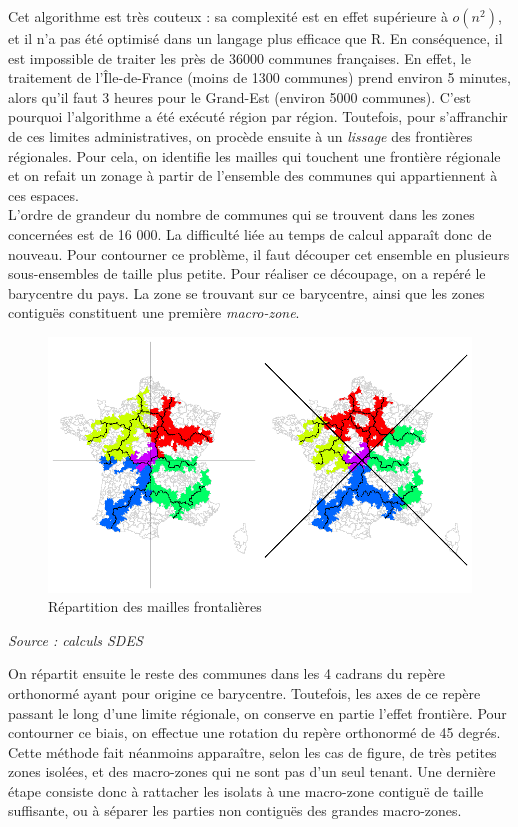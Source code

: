 \documentclass[12pt, a4paper]{article}
\begin{document}
Cet algorithme est très couteux : sa complexité est en effet supérieure à $o(n^2)$, et il n'a pas été optimisé dans un langage plus efficace que R. En conséquence, il est impossible de traiter les près de 36000 communes françaises. En effet, le traitement de l'Île-de-France (moins de 1300 communes) prend environ 5 minutes, alors qu'il faut 3 heures pour le Grand-Est (environ 5000 communes). C'est pourquoi l'algorithme a été exécuté région par région. Toutefois, pour s'affranchir de ces limites administratives, on procède ensuite à un \emph{lissage} des frontières régionales. Pour cela, on identifie les mailles qui touchent une frontière régionale et on refait un zonage à partir de l'ensemble des communes qui appartiennent à ces espaces.\\
L'ordre de grandeur du nombre de communes qui se trouvent dans les zones concernées est de 16 000. La difficulté liée au temps de calcul apparaît donc de nouveau. Pour contourner ce problème, il faut découper cet ensemble en plusieurs sous-ensembles de taille plus petite. Pour réaliser ce découpage, on a repéré le barycentre du pays. La zone se trouvant sur ce barycentre, ainsi que les zones contiguës constituent une première \emph{macro-zone}.



\begin{figure}[H]
\caption{Répartition des mailles frontalières}
\begin{center}
\includegraphics[scale=.7]{img/Methodo_decoupage.png}
\end{center}
\end{figure}
\emph{Source : calculs SDES}


On répartit ensuite le reste des communes dans les 4 cadrans du repère orthonormé ayant pour origine ce barycentre. Toutefois, les axes de ce repère passant le long d'une limite régionale, on conserve en partie l'effet frontière. Pour contourner ce biais, on effectue une rotation du repère orthonormé de 45 degrés.
Cette méthode fait néanmoins apparaître, selon les cas de figure, de très petites zones isolées, et des macro-zones qui ne sont pas d'un seul tenant. Une dernière étape consiste donc à rattacher les isolats à une macro-zone contiguë de taille suffisante, ou à séparer les parties non contiguës des grandes macro-zones.
\end{document}
